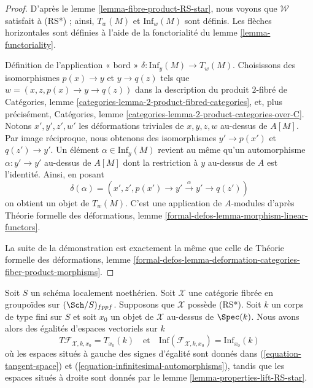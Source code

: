 \begin{proof}
D'après le lemme \ref{lemma-fibre-product-RS-star}, nous voyons que
$\mathcal{W}$ satisfait à (RS*) ; ainsi, $T_w(M)$ et $\text{Inf}_w(M)$ sont
définis. Les flèches horizontales sont définies à l'aide de la fonctorialité
du lemme \ref{lemma-functoriality}.

\medskip\noindent
Définition de l'application « bord »
$\delta : \text{Inf}_y(M) \to T_w(M)$. Choisissons des isomorphismes
$p(x) \to y$ et $y \to q(z)$ tels que
$w = (x, z, p(x) \to y \to q(z))$ dans la description du produit $2$-fibré
de Catégories, lemme \ref{categories-lemma-2-product-fibred-categories}, et,
plus précisément, Catégories, lemme
\ref{categories-lemma-2-product-categories-over-C}. Notons
$x', y', z', w'$ les déformations triviales de $x, y, z, w$ au-dessus de
$A[M]$. Par image réciproque, nous obtenons des isomorphismes $y' \to p(x')$
et $q(z') \to y'$. Un élément $\alpha \in \text{Inf}_y(M)$ revient au même
qu'un automorphisme $\alpha : y' \to y'$ au-dessus de $A[M]$ dont la
restriction à $y$ au-dessus de $A$ est l'identité. Ainsi, en posant
$$
\delta(\alpha) =
(x', z', p(x') \to y' \xrightarrow{\alpha} y' \to q(z'))
$$
on obtient un objet de $T_w(M)$. C'est une application de $A$-modules d'après
Théorie formelle des déformations, lemme
\ref{formal-defos-lemma-morphism-linear-functors}.

\medskip\noindent
La suite de la démonstration est exactement la même que celle de Théorie
formelle des déformations, lemme
\ref{formal-defos-lemma-deformation-categories-fiber-product-morphisms}.
\end{proof}

\begin{remark}
\label{remark-compare-deformation-spaces}
Soit $S$ un schéma localement noethérien. Soit $\mathcal{X}$ une catégorie
fibrée en groupoïdes sur $(\Sch/S)_{fppf}$. Supposons que $\mathcal{X}$
possède (RS*). Soit $k$ un corps de type fini sur $S$ et soit $x_0$ un objet
de $\mathcal{X}$ au-dessus de $\Spec(k)$. Nous avons alors des égalités
d'espaces vectoriels sur $k$
$$
T\mathcal{F}_{\mathcal{X}, k, x_0} = T_{x_0}(k)
\quad\text{et}\quad
\text{Inf}(\mathcal{F}_{\mathcal{X}, k, x_0}) =
\text{Inf}_{x_0}(k)
$$
où les espaces situés à gauche des signes d'égalité sont donnés dans
(\ref{equation-tangent-space}) et
(\ref{equation-infinitesimal-automorphisms}), tandis que les espaces situés à
droite sont donnés par le lemme \ref{lemma-properties-lift-RS-star}.
\end{remark}

